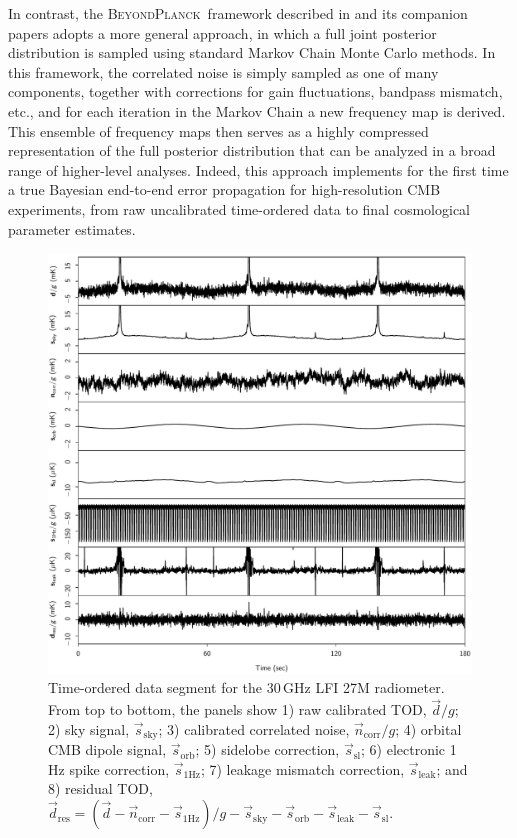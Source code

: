 \documentclass[twocolumn]{aa}
\renewcommand{\d}[0]{\vec{d}}
\newcommand{\n}[0]{\vec{n}}
\newcommand{\s}[0]{\vec{s}}
\newcommand{\BP}{\textsc{BeyondPlanck}}
\begin{document}
In contrast, the \BP\ framework described in \citet{bp01} and its
companion papers adopts a more general approach, in which a full
joint posterior distribution is sampled using standard Markov Chain
Monte Carlo methods. In this framework, the correlated noise is simply
sampled as one of many components, together with corrections for gain
fluctuations, bandpass mismatch, etc., and for each iteration in the
Markov Chain a new frequency map is derived. This ensemble of
frequency maps then serves as a highly compressed representation of
the full posterior distribution that can be analyzed in a broad range
of higher-level analyses. Indeed, this approach implements for the first time 
a true Bayesian end-to-end error propagation for high-resolution
CMB experiments, from raw uncalibrated time-ordered data to final
cosmological parameter estimates.

\begin{figure}[t]
  \center
  \includegraphics[width=\linewidth]{figs/tod_27M_pid1000_v1.pdf}
  \caption{Time-ordered data segment for the 30\,GHz LFI 27M
    radiometer. From top to bottom, the panels show 1) raw calibrated
    TOD, $\d/g$; 2) sky signal, $\s_{\mathrm{sky}}$; 3) calibrated
    correlated noise, $\n_{\mathrm{corr}}/g$; 4) orbital CMB dipole
    signal, $\s_{\mathrm{orb}}$; 5) sidelobe correction, $\s_{\mathrm{sl}}$; 
    6) electronic 1\,Hz spike correction, $\s_{\mathrm{1Hz}}$;
    7) leakage mismatch correction, $\s_{\mathrm{leak}}$;  and 8)
    residual TOD, $\d_{\mathrm{res}} = (\d-\n_{\mathrm{corr}} - \s_{\mathrm{1Hz}})/g -
    \s_{\mathrm{sky}} - \s_{\mathrm{orb}} - \s_{\mathrm{leak}} -
    \s_{\mathrm{sl}}$.}
  \label{fig:todplot}
\end{figure}
\end{document}
